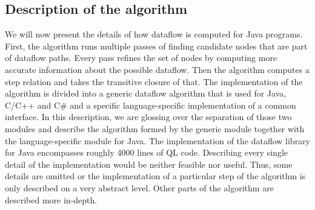 \subsection{Description of the algorithm}
We will now present the details of how dataflow is computed for Java programs.
First, the algorithm runs multiple passes of finding candidate nodes that are part 
of dataflow paths.
Every pass refines the set of nodes by computing more accurate information about the 
possible dataflow.
Then the algorithm computes a step relation and takes the transitive closure of that.
The implementation of the algorithm is divided into a generic dataflow algorithm that is 
used for Java, C/C++ and C\# and a specific language-specific implementation of a common interface.
In this description, we are glossing over the separation of those two modules and 
describe the algorithm formed by the generic module together with the language-specific
module for Java.
The implementation of the dataflow library for Java encompasses roughly 4000 lines of
QL code. Describing every single detail of the implementation would be neither feasible nor 
useful. Thus, some details are omitted or the implementation of a particular step 
of the algorithm is only described on a very abstract level.
Other parts of the algorithm are described more in-depth.

